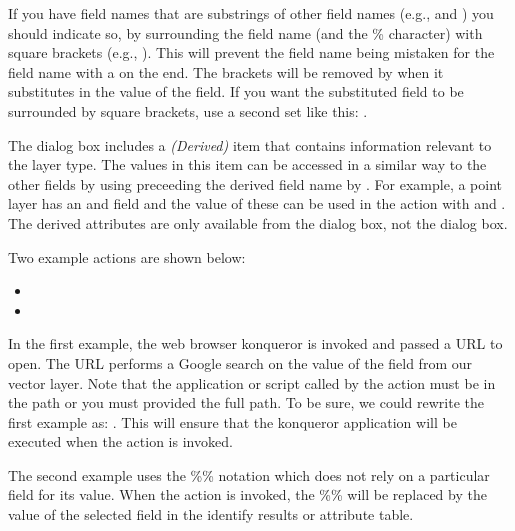 If you have field names that are substrings of other field names (e.g., 
and ) you should
indicate so, by surrounding the field name (and the \% character) with square
brackets (e.g., \usertext{[\%col10]}). This will prevent the  field
name being mistaken for the  field name with a 
on the end. The brackets will be removed by \qg when it substitutes in the
value of the field. If you want the substituted field to be surrounded by square
brackets, use a second set like this: \usertext{[[\%col10]]}.

The  dialog box includes a {\em (Derived)} item that
contains information relevant to the layer type. The
values in this item can be accessed in a similar way to the other fields
by using preceeding the derived field name by . For
example, a point layer has an  and  field and the
value of these can be used in the action with  and
. The derived attributes are only available from the
 dialog box, not the  dialog box.

Two example actions are shown below:

\begin{itemize}[label=--]
  \item {}
  \item {}
\end{itemize}

In the first example, the web browser konqueror is invoked and passed a URL to
open. The URL performs a Google search on the value of the  field
from our vector layer. Note that the application or script called by the
action must be in the path or you must provided the full path. To be sure, we could
rewrite the first example as: . This will ensure that the konqueror
application will be executed when the action is invoked.

The second example uses the \%\% notation which does not rely on a particular
field for its value. When the action is invoked, the \%\% will be replaced by
the value of the selected field in the identify results or attribute table.

\label{label_usingactions}

